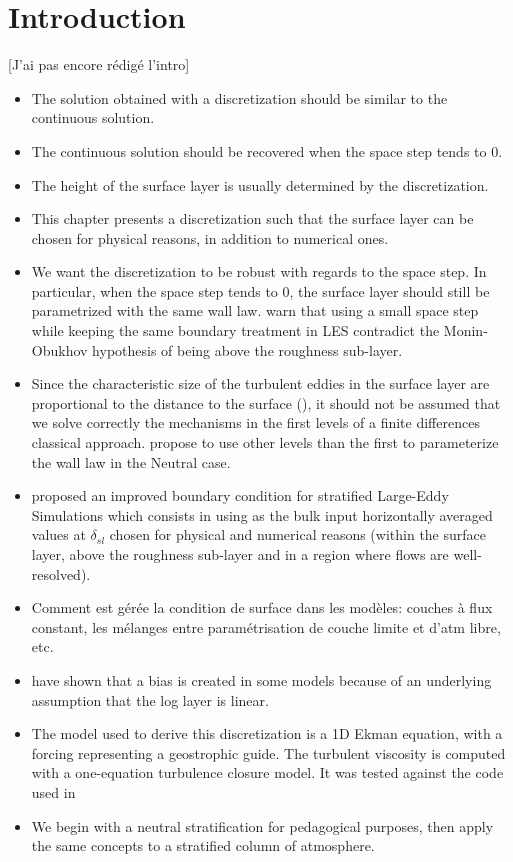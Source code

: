 \section{Introduction}
{\color{red} [J'ai pas encore rédigé l'intro]}
\begin{itemize}
\item The solution obtained with a discretization
	should be similar to the continuous solution.
\item The continuous solution should be recovered when
	the space step tends to 0.
\item The height of the surface layer
	is usually determined by the discretization.
\item This chapter presents a discretization such that
	the surface layer can be chosen for physical reasons,
	in addition to numerical ones.
\item We want the discretization to be robust with regards to
	the space step. In particular, when the space step
	tends to 0, the surface layer should still
	be parametrized with the same wall law.
	\cite{basu_cautionary_2017} warn that
	using a small space step while keeping
	the same boundary treatment in LES contradict the Monin-Obukhov
	hypothesis of being above the roughness sub-layer.
\item Since the characteristic
	size of the turbulent eddies in the surface layer are
		proportional to the distance to the surface (\cite{kawai_wall-modeling_2012}),
		it should not be assumed that we solve
		correctly the mechanisms in the first levels
		of a finite differences classical approach.
		\cite{kawai_wall-modeling_2012} propose to use other
		levels than the first to parameterize the
		wall law in the Neutral case.
	\item \cite{maronga_improved_2020} proposed an improved
		boundary condition for stratified Large-Eddy Simulations
		which consists in using as the bulk input
		horizontally averaged values at
		$\delta_{sl}$ chosen for physical and numerical
		reasons (within the surface layer, above the
		roughness sub-layer and in a region where flows are
		well-resolved).
\item Comment est gérée la condition de surface dans les modèles:
	couches à flux constant, les mélanges entre paramétrisation
	de couche limite et d'atm libre, etc.
\item \cite{nishizawa_surface_2018} have shown that a bias is created
	in some models
	because of an underlying assumption that the log layer
		is linear.
	\item The model used to derive this discretization is a 1D Ekman
	equation, with a forcing representing a geostrophic guide.
		The turbulent viscosity is computed with a
		one-equation turbulence closure model. It was
		tested against the code used in \cite{lemarie_simplified_2021}
\item We begin with a neutral stratification for pedagogical purposes,
	then apply the same concepts to a stratified column of
		atmosphere.
\end{itemize}
